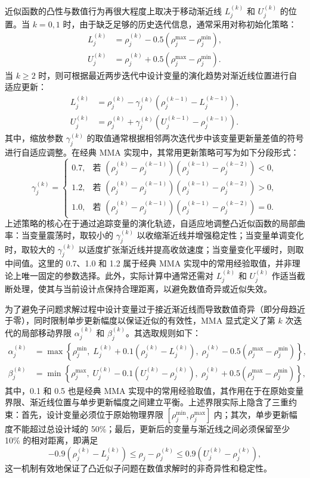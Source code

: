 近似函数的凸性与数值行为再很大程度上取决于移动渐近线 $L_j^{(k)}$ 和 $U_j^{(k)}$ 的位置。当 $k=0,1$ 时，由于缺乏足够的历史迭代信息，通常采用对称初始化策略：
\[
\begin{aligned} 
	L_j^{(k)} &= \rho_j^{(k)} - 0.5(\rho_j^{\max}-\rho_j^{\min}),\\ 
	U_j^{(k)} &= \rho_j^{(k)} + 0.5(\rho_j^{\max}-\rho_j^{\min}). 
\end{aligned}
\]
当 $k\ge 2$ 时，则可根据最近两步迭代中设计变量的演化趋势对渐近线位置进行自适应更新：
\[
\begin{aligned} 
	L_j^{(k)} &= \rho_j^{(k)} - \gamma_j^{(k)}(\rho_j^{(k-1)}-L_j^{(k-1)}),\\ 
	U_j^{(k)} &= \rho_j^{(k)} + \gamma_j^{(k)}(U_j^{(k-1)}-\rho_j^{(k-1)}).
\end{aligned}
\]
其中，缩放参数 $\gamma_j^{(k)}$ 的取值通常根据相邻两次迭代步中该变量更新量差值的符号进行自适应调整。在经典 MMA 实现中，其常用更新策略可写为如下分段形式：
\[
\gamma_j^{(k)} = 
\begin{cases} 
	0.7, & \text{若 } (\rho_j^{(k)}-\rho_j^{(k-1)})(\rho_j^{(k-1)}-\rho_j^{(k-2)}) < 0, \\ 
	1.2, & \text{若 } (\rho_j^{(k)}-\rho_j^{(k-1)})(\rho_j^{(k-1)}-\rho_j^{(k-2)}) > 0, \\ 
	1.0, & \text{若 } (\rho_j^{(k)}-\rho_j^{(k-1)})(\rho_j^{(k-1)}-\rho_j^{(k-2)}) = 0.
\end{cases}
\]
上述策略的核心在于通过追踪变量的演化轨迹，自适应地调整凸近似函数的局部曲率：当变量震荡时，取较小的 $\gamma_j^{(k)}$ 以收缩渐近线并增强稳定性；当变量单调变化时，取较大的 $\gamma_j^{(k)}$ 以适度扩张渐近线并提高收敛速度；当变量变化平缓时，则取中间值。这里的 0.7、1.0 和 1.2 属于经典 MMA 实现中的常用经验取值，并非理论上唯一固定的参数选择。此外，实际计算中通常还需对 $L_j^{(k)}$ 和 $U_j^{(k)}$ 作适当截断处理，使其与当前设计点保持合理距离，以避免数值奇异或近似失效。

为了避免子问题求解过程中设计变量过于接近渐近线而导致数值奇异（即分母趋近于零），同时限制单步更新幅度以保证近似的有效性，MMA 显式定义了第 $k$ 次迭代的局部移动界限 $\alpha_j^{(k)}$ 和 $\beta_j^{(k)}$。其选取规则如下：
\[
\begin{aligned} 
	\alpha_j^{(k)} &= \max\left\{ \rho_j^{\min},\; L_j^{(k)} + 0.1(\rho_j^{(k)} - L_j^{(k)}),\; \rho_j^{(k)} - 0.5(\rho_j^{\max} - \rho_j^{\min}) \right\},\\ 
	\beta_j^{(k)} &= \min\left\{ \rho_j^{\max},\; U_j^{(k)} - 0.1(U_j^{(k)} - \rho_j^{(k)}),\; \rho_j^{(k)} + 0.5(\rho_j^{\max} - \rho_j^{\min}) \right\}, 
\end{aligned}
\]
其中，0.1 和 0.5 也是经典 MMA 实现中的常用经验取值，其作用在于在原始变量界限、渐近线位置与单步更新幅度之间建立平衡。上述界限实际上隐含了三重约束：首先，设计变量必须位于原始物理界限 $[\rho_j^{\min}, \rho_j^{\max}]$ 内；其次，单步更新幅度不能超过总设计域的 50\%；最后，更新后的变量与渐近线之间必须保留至少 10\% 的相对距离，即满足
\[
-0.9(\rho_j^{(k)} - L_j^{(k)}) \leq \rho_j - \rho_j^{(k)} \leq 0.9(U_j^{(k)} - \rho_j^{(k)}),
\]
这一机制有效地保证了凸近似子问题在数值求解时的非奇异性和稳定性。

